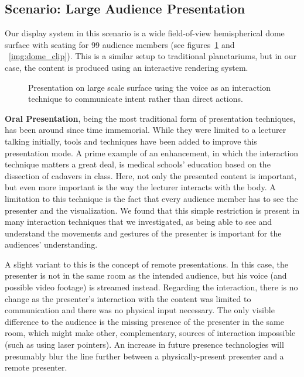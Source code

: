 \documentclass[review,journal]{vgtc}         %
\begin{document}
\subsection{Scenario: Large Audience Presentation} \label{sec:largeaudience}
Our display system in this scenario is a wide field-of-view hemispherical dome surface with seating for 99 audience members (see figures~\ref{img:dome_presentation} and ~\ref{img:dome_clip}).
This is a similar setup to traditional planetariums, but in our case, the content is produced using an interactive rendering system.

\begin{figure}[htb]
	\centering
	\caption{Presentation on large scale surface using the voice as an interaction technique to communicate intent rather than direct actions.}
	\label{img:dome_presentation}
\end{figure}

\noindent \textbf{Oral Presentation}, being the most traditional form of presentation techniques, has been around since time immemorial.
While they were limited to a lecturer talking initially, tools and techniques have been added to improve this presentation mode.
A prime example of an enhancement, in which the interaction technique matters a great deal, is medical schools' education based on the dissection of cadavers in class.
Here, not only the presented content is important, but even more important is the way the lecturer interacts with the body.
A limitation to this technique is the fact that every audience member has to see the presenter and the visualization.
We found that this simple restriction is present in many interaction techniques that we investigated, as being able to see and understand the movements and gestures of the presenter is important for the audiences' understanding.

A slight variant to this is the concept of remote presentations.
In this case, the presenter is not in the same room as the intended audience, but his voice (and possible video footage) is streamed instead.
Regarding the interaction, there is no change as the presenter's interaction with the content was limited to communication and there was no physical input necessary.
The only visible difference to the audience is the missing presence of the presenter in the same room, which might make other, complementary, sources of interaction impossible (such as using laser pointers).
An increase in future presence technologies will presumably blur the line further between a physically-present presenter and a remote presenter.
\end{document}
